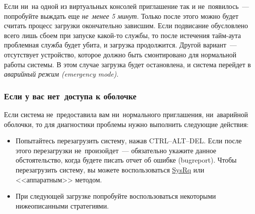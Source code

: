 \documentclass[10pt,oneside,a4paper]{article}
\begin{document}
Если ни~на одной из виртуальных консолей приглашение так и не~появилось~---
попробуйте выждать еще \emph{не~менее 5 минут}. Только после этого можно
будет считать процесс загрузки окончательно зависшим. Если подвисание
обусловлено всего лишь сбоем при запуске какой-то службы, то после истечения
тайм-аута проблемная служба будет убита, и загрузка продолжится. Другой
вариант~--- отсутствует устройство, которое должно быть смонтировано для
нормальной работы системы. В этом случае загрузка будет остановлена, и система
перейдет в \emph{аварийный режим (emergency mode)}.

\subsubsection{Если у вас нет~доступа к оболочке}

Если система не~предоставила вам ни~нормального приглашения, ни~аварийной
оболочки, то для диагностики проблемы нужно выполнить следующие действия:
\begin{itemize}
	\item Попытайтесь перезагрузить систему, нажав CTRL--ALT--DEL. Если после
		этого перезагрузки не~произойдет~--- обязательно укажите данное
		обстоятельство, когда будете писать отчет об ошибке (bugreport).
		Чтобы перезагрузить систему, вы можете воспользоваться
		\href{http://fedoraproject.org/wiki/QA/Sysrq}{SysRq} или
		<<аппаратным>> методом.
	\item При следующей загрузке попробуйте воспользоваться некоторыми
		нижеописанными стратегиями.
\end{itemize}
\end{document}
